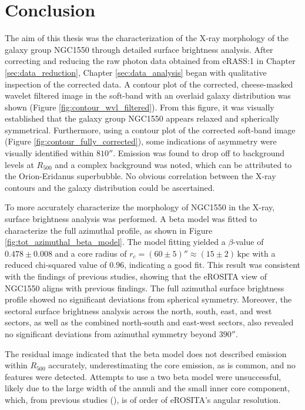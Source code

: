 
\chapter{Conclusion}
\label{sec:conclusion}
The aim of this thesis was the characterization of the X-ray morphology of the galaxy group NGC1550 through detailed surface brightness analysis. After correcting and reducing the raw photon data obtained from eRASS:1 in Chapter \ref{sec:data_reduction}, Chapter \ref{sec:data_analysis} began with qualitative inspection of the corrected data. A contour plot of the corrected, cheese-masked wavelet filtered image in the soft-band with an overlaid galaxy distribution was shown (Figure \ref{fig:contour_wvl_filtered}). From this figure, it was visually established that the galaxy group NGC1550 appears relaxed and spherically symmetrical. Furthermore, using a contour plot of the corrected soft-band image (Figure \ref{fig:contour_fully_corrected}), some indications of asymmetry were visually identified within \(810''\). Emission was found to drop off to background levels at \(R_{500}\) and a complex background was noted, which can be attributed to the Orion-Eridanus superbubble. No obvious correlation between the X-ray contours and the galaxy distribution could be ascertained.

To more accurately characterize the morphology of NGC1550 in the X-ray, surface brightness analysis was performed. A beta model was fitted to characterize the full azimuthal profile, as shown in Figure \ref{fig:tot_azimuthal_beta_model}. The model fitting yielded a \(\beta\)-value of \(0.478 \pm 0.008\) and a core radius of \(r_c = (60 \pm 5)'' \approx (15\pm2)\,\text{kpc}\) with a reduced chi-squared value of \(0.96\), indicating a good fit. This result was consistent with the findings of previous studies, showing that the eROSITA view of NGC1550 aligns with previous findings. The full azimuthal surface brightness profile showed no significant deviations from spherical symmetry. Moreover, the sectoral surface brightness analysis across the north, south, east, and west sectors, as well as the combined north-south and east-west sectors, also revealed no significant deviations from azimuthal symmetry beyond \(390''\).

The residual image indicated that the beta model does not described emission within \(R_{500}\) accurately, underestimating the core emission, as is common, and no features were detected. Attempts to use a two beta model were unsuccessful, likely due to the large width of the annuli and the small inner core component, which, from previous studies (\cite{Kawaharada_2009}), is of order of eROSITA's angular resolution. 

